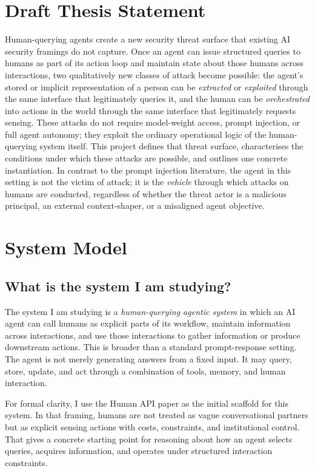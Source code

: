\documentclass[11pt]{article}
\begin{document}
\section{Draft Thesis Statement}

Human-querying agents create a new security threat surface that existing AI security framings do not capture. Once an agent can issue structured queries to humans as part of its action loop and maintain state about those humans across interactions, two qualitatively new classes of attack become possible: the agent's stored or implicit representation of a person can be \emph{extracted} or \emph{exploited} through the same interface that legitimately queries it, and the human can be \emph{orchestrated} into actions in the world through the same interface that legitimately requests sensing. These attacks do not require model-weight access, prompt injection, or full agent autonomy; they exploit the ordinary operational logic of the human-querying system itself. This project defines that threat surface, characterises the conditions under which these attacks are possible, and outlines one concrete instantiation. In contrast to the prompt injection literature, the agent in this setting is not the victim of attack; it is the \emph{vehicle} through which attacks on humans are conducted, regardless of whether the threat actor is a malicious principal, an external context-shaper, or a misaligned agent objective.


\section{System Model}

\subsection{What is the system I am studying?}

The system I am studying is a \emph{human-querying agentic system} in which an AI agent can call humans as explicit parts of its workflow, maintain information across interactions, and use those interactions to gather information or produce downstream actions. This is broader than a standard prompt-response setting. The agent is not merely generating answers from a fixed input. It may query, store, update, and act through a combination of tools, memory, and human interaction.

For formal clarity, I use the Human API paper as the initial scaffold for this system. In that framing, humans are not treated as vague conversational partners but as explicit sensing actions with costs, constraints, and institutional control. That gives a concrete starting point for reasoning about how an agent selects queries, acquires information, and operates under structured interaction constraints. \citep{oliver2026humanapi}
\end{document}
